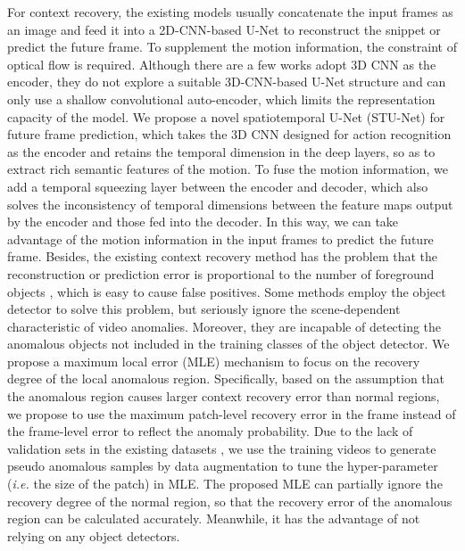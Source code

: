 \documentclass[lettersize,journal]{IEEEtran}
\begin{document}
For context recovery, the existing models \cite{FutureFrame2018liua, MemorizingNormality2019gonga, ClozeTest2020yu, LearningMemoryGuided2020parka, FutureFrame2021luo, LearningNormal2021lva, HybridVideo2021liua, AppearanceMotionMemory2021caia, RobustUnsupervised2021wanga, AnomalyDetection2022fang, VariationalAbnormal2022li} usually concatenate the input frames as an image and feed it into a 2D-CNN-based U-Net \cite{UnetConvolutional2015ronneberger} to reconstruct the snippet or predict the future frame.
To supplement the motion information, the constraint of optical flow is required.
Although there are a few works \cite{AnomalyDetection2021georgescua, DeepCascadeCascading2017sabokroua, DeepOneClass2020wu} adopt 3D CNN as the encoder, they do not explore a suitable 3D-CNN-based U-Net structure and can only use a shallow convolutional auto-encoder, which limits the representation capacity of the model.
We propose a novel spatiotemporal U-Net (STU-Net) for future frame prediction, which takes the 3D CNN designed for action recognition as the encoder and retains the temporal dimension in the deep layers, so as to extract rich semantic features of the motion.
To fuse the motion information, we add a temporal squeezing layer between the encoder and decoder, which also solves the inconsistency of temporal dimensions between the feature maps output by the encoder and those fed into the decoder.
In this way, we can take advantage of the motion information in the input frames to predict the future frame.
Besides, the existing context recovery method has the problem that the reconstruction or prediction error is proportional to the number of foreground objects \cite{SurveySingleScene2022ramachandra}, which is easy to cause false positives.
Some methods \cite{ObjectCentricAutoEncoders2019ionescua, ClozeTest2020yu, HybridVideo2021liua, AnomalyDetection2021georgescua, BackgroundAgnosticFramework2021georgescua} employ the object detector to solve this problem, but seriously ignore the scene-dependent characteristic of video anomalies.
Moreover, they are incapable of detecting the anomalous objects not included in the training classes of the object detector.
We propose a maximum local error (MLE) mechanism to focus on the recovery degree of the local anomalous region.
Specifically, based on the assumption that the anomalous region causes larger context recovery error than normal regions, we propose to use the maximum patch-level recovery error in the frame instead of the frame-level error to reflect the anomaly probability.
Due to the lack of validation sets in the existing datasets \cite{AnomalyDetection2010mahadevan, AbnormalEvent2013lua, RevisitSparse2017luoa, MultitimescaleTrajectory2020rodriguesa}, we use the training videos to generate pseudo anomalous samples by data augmentation to tune the hyper-parameter (\textit{i.e.} the size of the patch) in MLE.
The proposed MLE can partially ignore the recovery degree of the normal region, so that the recovery error of the anomalous region can be calculated accurately.
Meanwhile, it has the advantage of not relying on any object detectors.
\end{document}
